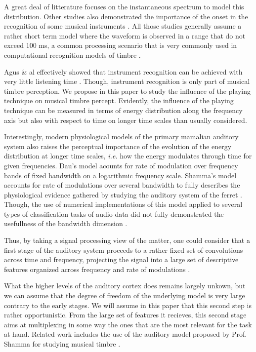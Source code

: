 \documentclass{article}
\begin{document}
A great deal of litterature focuses on the instantaneous spectrum \cite{grey1978perceptual} to model this distribution. Other studies also demonstrated the importance of the onset in the recognition of some musical instruments \cite{eronen2001comparison}. All those studies generally assume a rather short term model where the waveform is observed in a range that do not exceed 100 ms, a common processing scenario that is very commonly used in computational recognition models of timbre \cite{tzanetakis2002musical}.

Agus \& al effectively showed that instrument recognition can be achieved with very little listening time \cite{agus2012fast}. Though, instrument recognition is only part of musical timbre perception. We propose in this paper to study the influence of the playing technique on musical timbre percept. Evidently, the influence of the playing technique can be measured in terms of energy distribution along the frequency axis but also with respect to time on longer time scales than usually considered.

Interestingly, modern physiological models of the primary mamalian auditory system also raises the perceptual importance of the evolution of the energy distribution at longer time scales, \textit{i.e.} how the energy modulates through time for given frequencies.  Dau's model acounts for  rate of modulation over frequency bands of fixed bandwidth on a logarithmic frequency scale\cite{dau1997modeling}. Shamma's model accounts for rate  of modulations over several bandwidth to fully describes the physiological evidence gathered by studying the auditory system of the ferret \cite{yang1992auditory}. Though, the use of numerical implementations of this model applied to several types of classification tasks of audio data did not fully demonstrated the usefullness of the bandwidth dimension \cite{mesgarani2006discrimination}.

Thus, by taking a signal processing view of the matter, one could consider that a first stage of the auditory system proceeds to a rather fixed set of convolutions across time and frequency, projecting the signal into a large set of descriptive features organized across frequency and rate of modulations \cite{anden2014deep}.

What the higher levels of the auditory cortex does remains largely unkown, but we can assume that the degree of freedom of the underlying model is very large contrary to the early stages.  We will assume in this paper that this second step is rather opportunistic. From the large set of features it recieves, this second stage aims at multiplexing in some way the ones that are the most relevant for the task at hand. Related work includes the use of the auditory model proposed by Prof. Shamma for studying musical timbre \cite{patil2012music}.
\end{document}
